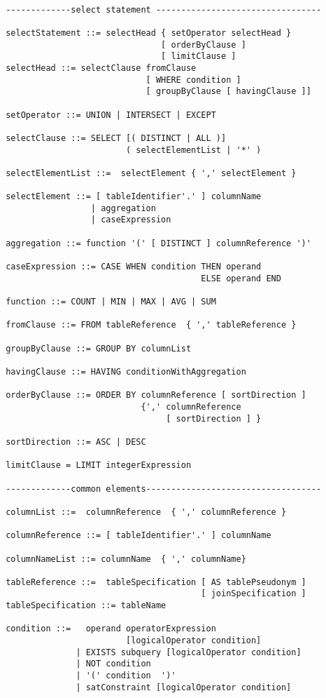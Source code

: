 \begin{lstlisting}
 
 -------------select statement ---------------------------------

 selectStatement ::= selectHead { setOperator selectHead } 
                                [ orderByClause ] 
                                [ limitClause ]
 selectHead ::= selectClause fromClause  
                             [ WHERE condition ] 
                             [ groupByClause [ havingClause ]]
                                
 setOperator ::= UNION | INTERSECT | EXCEPT    

 selectClause ::= SELECT [( DISTINCT | ALL )] 
                         ( selectElementList | '*' )

 selectElementList ::=  selectElement { ',' selectElement }

 selectElement ::= [ tableIdentifier'.' ] columnName 
                  | aggregation 
                  | caseExpression

 aggregation ::= function '(' [ DISTINCT ] columnReference ')' 

 caseExpression ::= CASE WHEN condition THEN operand 
                                        ELSE operand END 

 function ::= COUNT | MIN | MAX | AVG | SUM

 fromClause ::= FROM tableReference  { ',' tableReference } 

 groupByClause ::= GROUP BY columnList

 havingClause ::= HAVING conditionWithAggregation 

 orderByClause ::= ORDER BY columnReference [ sortDirection ] 
                            {',' columnReference 
                                 [ sortDirection ] }

 sortDirection ::= ASC | DESC

 limitClause = LIMIT integerExpression

 -------------common elements-----------------------------------

 columnList ::=  columnReference  { ',' columnReference } 
 
 columnReference ::= [ tableIdentifier'.' ] columnName
 
 columnNameList ::= columnName  { ',' columnName} 
 
 tableReference ::=  tableSpecification [ AS tablePseudonym ] 
                                        [ joinSpecification ]
 tableSpecification ::= tableName
   
 condition ::=   operand operatorExpression 
                         [logicalOperator condition]  
               | EXISTS subquery [logicalOperator condition]             
               | NOT condition                                           
               | '(' condition  ')'                                      
               | satConstraint [logicalOperator condition]
              

\end{lstlisting}
